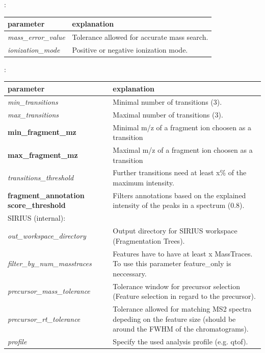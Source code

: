 \noindent{}:
\begin{center}
\begin{tabular*}{\textwidth}{ p{5.5cm}|p{10.5cm} }
\textbf{parameter} & \textbf{explanation} \\ \hline
\textit{mass\_error\_value} & Tolerance allowed for accurate mass search. \\
\textit{ionization\_mode} &  Positive or negative ionization mode. \\
\end{tabular*}
\end{center}

\noindent{}:
\begin{center}
\begin{tabular*}{\textwidth}{ p{5.5cm}|p{10.5cm} }
\textbf{parameter} & \textbf{explanation} \\ \hline
\textit{min\_transitions} & Minimal number of transitions (3). \\
\textit{max\_transitions} &  Maximal number of transitions (3). \\
\textbf{min\_fragment\_mz} & Minimal m/z of a fragment ion choosen as a transition \\
\textbf{max\_fragment\_mz} & Maximal m/z of a fragment ion choosen as a transition \\
\textit{transitions\_threshold} & Further transitions need at least x\% of the maximum intensity. \\
\textbf{fragment\_annotation score\_threshold} & Filters annotations based on the explained intensity of the peaks in a spectrum (0.8). \\
SIRIUS (internal): & \\
\textit{out\_workspace\_directory} & Output directory for SIRIUS workspace (Fragmentation Trees). \\
\textit{filter\_by\_num\_masstraces} &  Features have to have at least x MassTraces. To use this parameter feature\_only is neccessary. \\
\textit{precursor\_mass\_tolerance} & Tolerance window for precursor selection (Feature selection in regard to the precursor). \\
\textit{precursor\_rt\_tolerance} & Tolerance allowed for matching MS2 spectra depeding on the feature size (should be around the FWHM of the chromatograms). \\
\textit{profile} & Specify the used analysis profile (e.g. qtof). \\

\end{tabular*}
\end{center}
